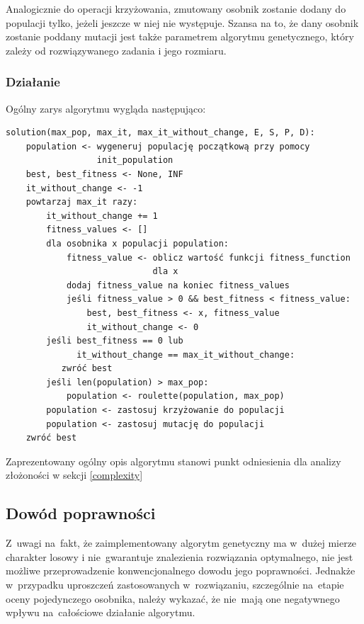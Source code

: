 \documentclass[12pt,a4paper]{article}
\theoremstyle{definition}
\begin{document}
\vspace{0.5em}
\noindent
 Analogicznie do operacji krzyżowania, zmutowany osobnik zostanie dodany do populacji tylko, jeżeli jeszcze w niej nie występuje. Szansa na to, że dany osobnik zostanie poddany mutacji jest także parametrem algorytmu genetycznego, który zależy od rozwiązywanego zadania i jego rozmiaru.

\newpage
\subsubsection{Działanie}
Ogólny zarys algorytmu wygląda następująco:\\
\begin{tcolorbox}[title=Pseudokod algorytmu]
\begin{verbatim}
solution(max_pop, max_it, max_it_without_change, E, S, P, D):
    population <- wygeneruj populację początkową przy pomocy 
                  init_population
    best, best_fitness <- None, INF
    it_without_change <- -1
    powtarzaj max_it razy:
        it_without_change += 1
        fitness_values <- []
        dla osobnika x populacji population:
            fitness_value <- oblicz wartość funkcji fitness_function 
                             dla x
            dodaj fitness_value na koniec fitness_values
            jeśli fitness_value > 0 && best_fitness < fitness_value:
                best, best_fitness <- x, fitness_value
                it_without_change <- 0
        jeśli best_fitness == 0 lub 
              it_without_change == max_it_without_change:
           zwróć best
        jeśli len(population) > max_pop:
            population <- roulette(population, max_pop)
        population <- zastosuj krzyżowanie do populacji
        population <- zastosuj mutację do populacji
    zwróć best
\end{verbatim}
\end{tcolorbox}

\vspace{0.5em}
\noindent
Zaprezentowany ogólny opis algorytmu stanowi punkt odniesienia dla analizy złożoności w sekcji \ref{complexity}

\subsection{Dowód poprawności}
\label{subsec:correctnessintervals}
Z~uwagi na~fakt, że zaimplementowany algorytm genetyczny ma w~dużej mierze charakter losowy i nie~gwarantuje znalezienia rozwiązania optymalnego, nie jest możliwe przeprowadzenie konwencjonalnego dowodu jego poprawności.
Jednakże w~przypadku uproszczeń zastosowanych w~rozwiązaniu, szczególnie na~etapie oceny pojedynczego osobnika, należy wykazać, że nie~mają one negatywnego wpływu na~całościowe działanie algorytmu.\\
\end{document}
